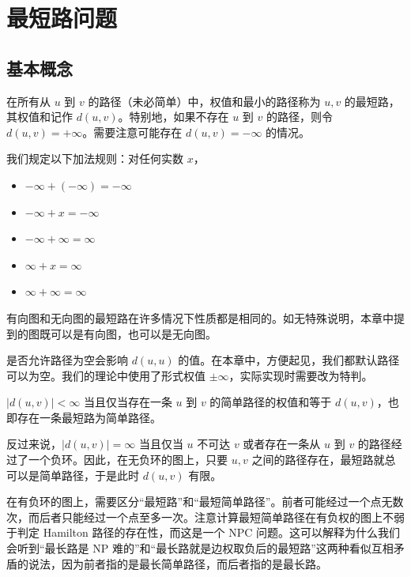 \chapter{最短路问题}

\section{基本概念}

\begin{definition}[最短路]
    在所有从 $u$ 到 $v$ 的路径（未必简单）中，权值和最小的路径称为 $u,v$ 的最短路，其权值和记作 $d(u,v)$。特别地，如果不存在 $u$ 到 $v$ 的路径，则令 $d(u,v)=+\infty$。需要注意可能存在 $d(u,v)=-\infty$ 的情况。
    
    我们规定以下加法规则：对任何实数 $x$，
    \begin{itemize}
        \item $-\infty+(-\infty)=-\infty$
        \item $-\infty+x=-\infty$
        \item $-\infty+\infty=\infty$
        \item $\infty+x=\infty$
        \item $\infty+\infty=\infty$
    \end{itemize}

    有向图和无向图的最短路在许多情况下性质都是相同的。如无特殊说明，本章中提到的图既可以是有向图，也可以是无向图。
\end{definition}
\begin{remark}
    是否允许路径为空会影响 $d(u,u)$ 的值。在本章中，方便起见，我们都默认路径可以为空。我们的理论中使用了形式权值 $\pm\infty$，实际实现时需要改为特判。
\end{remark}
\begin{lemma}
    $|d(u,v)|<\infty$ 当且仅当存在一条 $u$ 到 $v$ 的简单路径的权值和等于 $d(u,v)$，也即存在一条最短路为简单路径。
\end{lemma}
\begin{remark}
    反过来说，$|d(u,v)|=\infty$ 当且仅当 $u$ 不可达 $v$ 或者存在一条从 $u$ 到 $v$ 的路径经过了一个负环。因此，在无负环的图上，只要 $u,v$ 之间的路径存在，最短路就总可以是简单路径，于是此时 $d(u,v)$ 有限。
\end{remark}
\begin{remark}
    在有负环的图上，需要区分“最短路”和“最短简单路径”。前者可能经过一个点无数次，而后者只能经过一个点至多一次。注意计算最短简单路径在有负权的图上不弱于判定 Hamilton 路径的存在性，而这是一个 NPC 问题。这可以解释为什么我们会听到“最长路是 NP 难的”和“最长路就是边权取负后的最短路”这两种看似互相矛盾的说法，因为前者指的是最长简单路径，而后者指的是最长路。
\end{remark}

